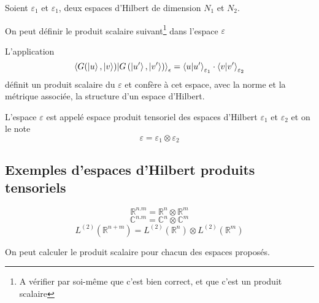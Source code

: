 Soient $\varepsilon_1$ et $\varepsilon_1$, deux espaces d'Hilbert de dimension $N_1$ et $N_2$.

On peut définir le produit scalaire suivant\footnote{A vérifier par soi-même que c'est bien correct, et que c'est un produit scalaire} dans l'espace $\varepsilon$ 
\begin{thm}
	L'application
	$$ \left\langle  G (\ket{u},\ket{v} )|  G \left(\ket{u'},\ket{v'}\right) \right\rangle_\epsilon = \braket{u|u'}_{\varepsilon_1} \cdot \braket{v|v'}_{\varepsilon_2}$$
	définit un produit scalaire du $\varepsilon$ et confère à cet espace, avec la norme et la métrique associée, la structure d'un espace d'Hilbert.
\end{thm}

\begin{definition}
	L'espace $\varepsilon$ est appelé espace produit tensoriel des espaces d'Hilbert $\varepsilon_1$ et $\varepsilon_2$ et on le note
	$$ \varepsilon = \varepsilon_1 \otimes \varepsilon_2$$
\end{definition}

\subsection{Exemples d'espaces d'Hilbert produits tensoriels}

$$ \mathbb{R}^{n. m} = \mathbb{R}^n \otimes \mathbb{R}^m $$
$$ \mathbb{C}^{n. m} = \mathbb{C}^n \otimes \mathbb{C}^m $$
$$ L^{(2)}( \mathbb{R}^{n+m}) = L^{(2)}( \mathbb{R}^{n}) \otimes L^{(2)}( \mathbb{R}^{m})$$

On peut calculer le produit scalaire pour chacun des espaces proposés.

